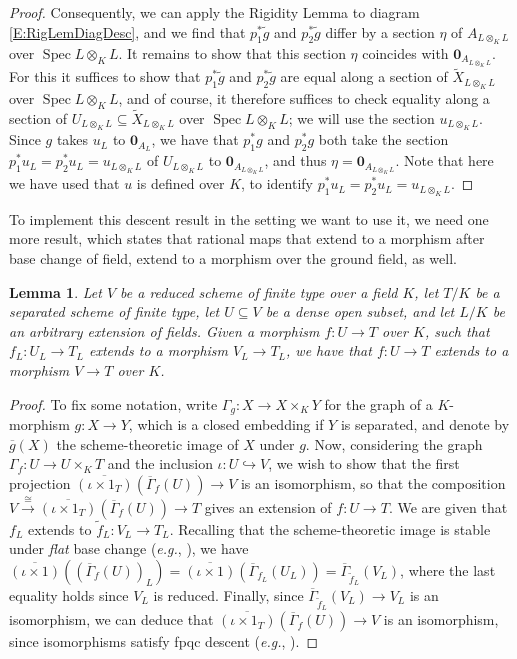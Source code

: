 \documentclass[11pt, reqno]{amsart}
\numberwithin{equation}{section}
\newtheorem{lem}[teo]{Lemma}
\theoremstyle{definition}
\theoremstyle{remark}
\def\iso{\cong}
\renewcommand{\bar}[1]{{\overline{#1}}}
\begin{document}
\begin{proof}
 Consequently, we can apply the Rigidity Lemma to  diagram \eqref{E:RigLemDiagDesc}, and we find that 
${p_1^*\tilde g}$ and ${p_2^*\tilde g}$ differ by a section
$\eta$ of  $A_{L\otimes_KL}$ over $\operatorname{Spec}L\otimes_KL$.
It remains to show that this section $\eta$ coincides
  with $\mathbf
0_{A_{L\otimes_KL}}$. 
For this it suffices to show that ${p_1^*\tilde g}$ and ${p_2^*\tilde g}$  are equal along a section of $\widetilde X_{L\otimes_KL}$ over $\operatorname{Spec}L\otimes_KL$, and of course,  it therefore suffices to check equality along a section of $U_{L\otimes_KL}\subseteq \widetilde X_{L\otimes_KL}$ over $\operatorname{Spec}L\otimes_KL$; we will use the section $u_{L\otimes_KL}$. 
 Since $g$ takes $u_L$ to $\mathbf 0_{A_L}$, we have that 
$p_1^*g$ and $p_2^*g$ both take the section $p_1^*u_L=p_2^*u_L=u_{L\otimes_KL}$  of $U_{L\otimes_K L}$ to
$\mathbf 0_{A_{L\otimes_KL}}$, and thus $\eta = \mathbf
0_{A_{L\otimes_KL}}$.  Note that here we have used that $u$ is defined over $K$, to identify $p_1^*u_L=p_2^*u_L=u_{L\otimes_KL}$.  
    \end{proof}


To implement this descent result in the setting we want to use it, we need one more result, which states that rational maps that extend to a morphism after base change of field, extend to a morphism over the ground field, as well. 

\begin{lem}\label{L:RatMapLK}
Let $V$ be a reduced scheme of finite type over a field $K$, let $T/K$
be a separated scheme of finite type, let $U\subseteq V$ be a dense
open subset, and let $L/K$ be an arbitrary extension of fields.  Given a morphism $f:U\to T$ over $K$, such that $f_L:U_L\to T_L$ extends to a morphism $V_L\to T_L$, we have that $f:U\to T$ extends to a morphism $V\to T$ over $K$.
\end{lem}
\begin{proof}
To fix some notation, write $\Gamma_g:X\to X \times_K Y$ for the graph of a $K$-morphism $g:X\to Y$, which is a closed 
embedding if $Y$ is separated, and denote by $\bar g(X)$ the scheme-theoretic image of $X$ under $g$.  
Now, considering the graph $\Gamma_f:U\to U\times_KT$ and the inclusion $\iota:U\hookrightarrow V$, 
we wish to show that the first projection $\bar{(\iota \times 1_T)}(\bar {\Gamma}_f(U))\to V$ is an isomorphism, so that the composition $V\stackrel{\iso}{\longrightarrow} \bar{(\iota \times 1_T)}(\bar {\Gamma}_f(U))\to T$ gives an extension of $f:U\to T$.  
We are given that $f_L$ extends to $\tilde f_L: V_L
  \to T_L$.
  Recalling that the scheme-theoretic image is stable under \emph{flat} base change (\emph{e.g.}, \cite[Prop.~V-8, p.217]{EH2000}), we have $\bar {(\iota\times 1)}((\bar {\Gamma}_f(U))_L)=\bar {(\iota\times 1)}( \bar {\Gamma}_{f_L}(U_L))=\bar {\Gamma}_{\tilde f_L}(V_L)$, where the last equality holds since $V_L$ is reduced.
          Finally, since $\bar {\Gamma}_{\tilde f_L}(V_L)\to V_L$ is an isomorphism, we can deduce that $\bar{(\iota \times 1_T)}(\bar \Gamma_f(U))\to V$ is an isomorphism, since isomorphisms satisfy fpqc descent (\emph{e.g.}, \cite[p.583]{GW20}).
\end{proof}
\end{document}
